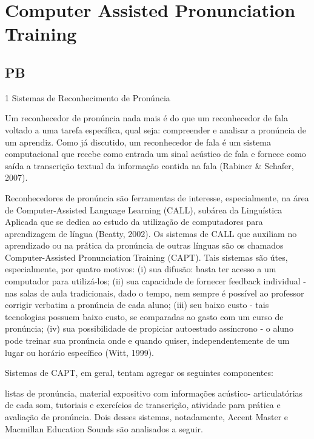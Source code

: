 \chapter{Computer Assisted Pronunciation Training}\label{ch:capt}

\section{PB}

1 Sistemas de Reconhecimento de Pron\'uncia

Um reconhecedor de pron\'uncia nada mais \'e do que um reconhecedor de fala
voltado a uma tarefa espec\'ifica, qual seja: compreender e analisar a
pron\'uncia de um aprendiz. Como j\'a discutido, um reconhecedor de fala \'e
um sistema computacional que recebe como entrada um sinal ac\'ustico de
fala e fornece como sa\'ida a transcri\c{c}\~ao textual da informa\c{c}\~ao contida na
fala (Rabiner \& Schafer, 2007).

Reconhecedores de pron\'uncia s\~ao ferramentas de interesse, especialmente,
na \'area de Computer-Assisted Language Learning (CALL), sub\'area da
Lingu\'istica Aplicada que se dedica ao estudo da utiliza\c{c}\~ao de
computadores para aprendizagem de l\'ingua (Beatty, 2002). Os sistemas de
CALL que auxiliam no aprendizado ou na pr\'atica da pron\'uncia de outras
l\'inguas s\~ao os chamados Computer-Assisted Pronunciation Training (CAPT).
Tais sistemas s\~ao \'utes, especialmente, por quatro motivos: (i) sua
difus\~ao: basta ter acesso a um computador para utiliz\'a-los; (ii) sua
capacidade de fornecer feedback individual - nas salas de aula
tradicionais, dado o tempo, nem sempre \'e poss\'ivel ao professor corrigir
verbatim a pron\'uncia de cada aluno; (iii) seu baixo custo - tais
tecnologias possuem baixo custo, se comparadas ao gasto com um curso de
pron\'uncia; (iv) sua possibilidade de propiciar autoestudo ass\'incrono - o
aluno pode treinar sua pron\'uncia onde e quando quiser, independentemente
de um lugar ou hor\'ario espec\'ifico (Witt, 1999).

Sistemas de CAPT, em geral, tentam agregar os  seguintes  componentes:

listas de pron\'uncia, material expositivo com informa\c{c}\~oes ac\'ustico-
articulat\'orias de cada som, tutoriais e exerc\'icios de transcri\c{c}\~ao,
atividade para pr\'atica e avalia\c{c}\~ao de pron\'uncia. Dois desses sistemas,
notadamente, Accent Master e Macmillan Education Sounds s\~ao analisados a
seguir.

